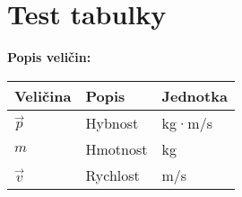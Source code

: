 \documentclass[11pt,a4paper]{article}
\begin{document}
\section{Test tabulky}

\textbf{Popis veličin:}

\begin{longtable}{lll}
\toprule
Veličina & Popis & Jednotka \\
\midrule
$\vec{p}$ & Hybnost & kg·m/s \\
$m$ & Hmotnost & kg \\
$\vec{v}$ & Rychlost & m/s \\
\bottomrule
\end{longtable}
\end{document}
